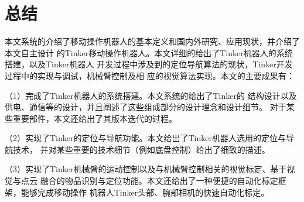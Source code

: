 \chapter{总结}


本文系统的介绍了移动操作机器人的基本定义和国内外研究、应用现状，并介绍了本文自主设计
的Tinker移动操作机器人。本文详细的给出了Tinker机器人的系统搭建，以及Tinker机器人
开发过程中涉及到的定位导航算法的现状，Tinker开发过程中的实现与调试，机械臂控制及相
应的视觉算法实现。本文的主要成果有：

（1）完成了Tinker机器人的系统搭建。本文系统的给出了Tinker的
结构设计以及供电、通信等的设计，并且阐述了这些组成部分的设计理念和设计细节。
对于某些重要部件，本文还给出了其版本迭代的过程。

（2）实现了Tinker的定位与导航功能。本文给出了Tinker机器人选用的定位与导航技术，
并对某些重要的技术细节（例如底盘控制）给出了细致的描述。

（3）实现了Tinker机械臂的运动控制以及与机械臂控制相关的视觉标定、基于视觉与点云
融合的物品识别与定位功能。本文还给出了一种便捷的自动化标定框架，能够完成移动操作
机器人Tinker头部、腕部相机的快速自动化标定。
